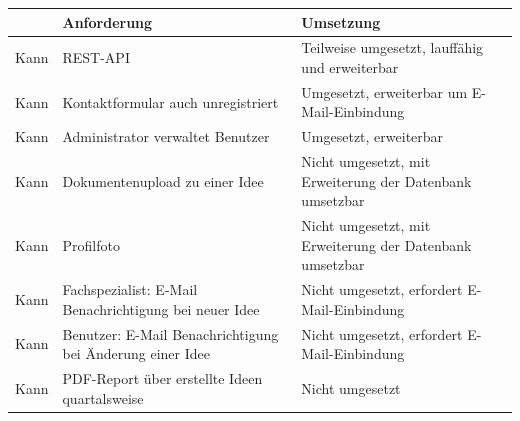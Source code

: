 \pagebreak
\begin{center}
    \begin{tabularx}{\linewidth}{
        |p{}%
        |p{}%
        |p{}|%
    }
        \hline
        & Anforderung & Umsetzung \\ \hline
        Kann & REST-API & Teilweise umgesetzt, lauffähig und erweiterbar \\ \hline
        Kann & Kontaktformular auch unregistriert & Umgesetzt, erweiterbar um E-Mail-Einbindung \\ \hline
        Kann & Administrator verwaltet Benutzer & Umgesetzt, erweiterbar \\ \hline
        Kann & Dokumentenupload zu einer Idee & Nicht umgesetzt, mit Erweiterung der Datenbank umsetzbar \\ \hline
        Kann & Profilfoto & Nicht umgesetzt, mit Erweiterung der Datenbank umsetzbar \\ \hline
        Kann & Fachspezialist: E-Mail Benachrichtigung bei neuer Idee & Nicht umgesetzt, erfordert E-Mail-Einbindung \\ \hline
        Kann & Benutzer: E-Mail Benachrichtigung bei Änderung einer Idee & Nicht umgesetzt, erfordert E-Mail-Einbindung \\ \hline
        Kann & PDF-Report über erstellte Ideen quartalsweise & Nicht umgesetzt \\ \hline
    \end{tabularx}
\end{center}

